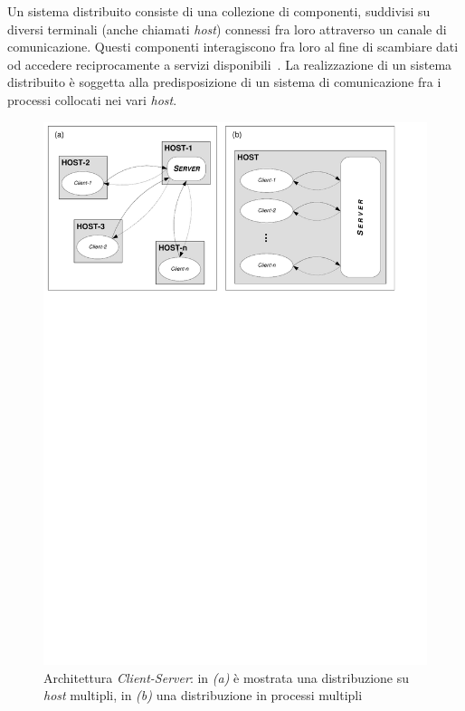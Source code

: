 Un sistema distribuito consiste di una collezione di componenti, suddivisi su diversi terminali (anche chiamati \emph{host}) connessi fra loro attraverso un canale di comunicazione. Questi componenti interagiscono fra loro al fine di scambiare dati od accedere reciprocamente a servizi disponibili~\cite{Mascolo:2002:MCM:770420.770423}.
La realizzazione di un sistema distribuito è soggetta alla predisposizione di un sistema di comunicazione fra i processi collocati nei vari \emph{host}.

\begin{figure}[h]
\centering
\includegraphics[scale=0.7, viewport=6 582 546 838]{Immagini/Capitolo2/Client-Server.pdf}
\caption[Architettura \emph{Client-Server}]{Architettura \emph{Client-Server}: in \emph{(a)} è mostrata una distribuzione su \emph{host} multipli, in \emph{(b)} una distribuzione in processi multipli}\label{fig:client-server}
\end{figure}

